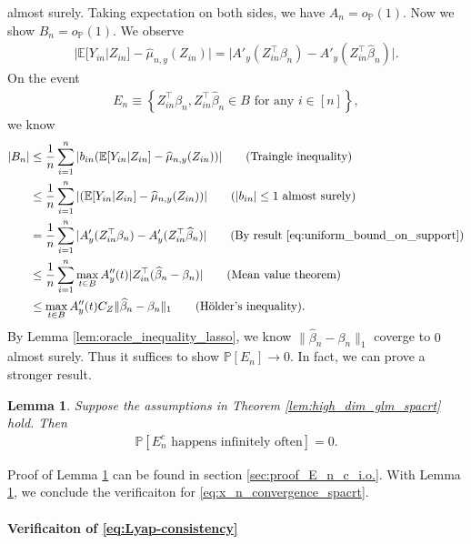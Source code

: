 \documentclass[12pt]{article}
\newtheorem{lemma}{Lemma}
\theoremstyle{definition}
\def\P{\mathbb{P}}
\def\P{\mathbb{P}}
\newcommand{\E}{\mathbb E}								%
\renewcommand{\P}{\mathbb{P}}							%
\newcommand{\srz}{Z}									%
\newcommand{\sry}{Y}									%
\begin{document}
almost surely. Taking expectation on both sides, we have $A_n=o_\P(1)$. Now we show $B_n=o_{\P}(1)$. We observe
\begin{align}\label{eq:uniform_bound_on_support}
  |\E[Y_{in}|\srz_{in}]-\widehat{\mu}_{n,y}(\srz_{in})|=|A'_y(\srz_{in}^\top\beta_n)-A'_y(\srz_{in}^\top \widehat \beta_n)|.
\end{align}
On the event 
\begin{align}\label{eq:magnitude_predictor}
  E_n\equiv \left\{\srz_{in}^\top\beta_n,\srz_{in}^\top \widehat \beta_n\in B\text{ for any }i\in[n]\right\},
\end{align}
we know
\begin{align*}
  |B_n|
  &
  \leq\frac{1}{n}\sum_{i=1}^n |b_{in}(\E[\sry_{in}|\srz_{in}]-\widehat{\mu}_{n,y}(\srz_{in}))|\tag{Traingle inequality}\\
  &
  \leq\frac{1}{n}\sum_{i=1}^n |(\E[\sry_{in}|\srz_{in}]-\widehat{\mu}_{n,y}(\srz_{in}))|\tag{$|b_{in}|\leq 1$ almost surely}\\
  &
  = \frac{1}{n}\sum_{i=1}^n|A'_y(\srz_{in}^\top\beta_n)-A'_y(\srz_{in}^\top \widehat \beta_n)|\tag{By result \eqref{eq:uniform_bound_on_support}}\\
  &
  \leq \frac{1}{n}\sum_{i=1}^n\max_{t\in B}A''_y(t)|\srz_{in}^\top(\widehat{\beta}_n-\beta_n)|\tag{Mean value theorem}\\
  &
  \leq \max_{t\in B}A''_y(t)C_Z\|\widehat{\beta}_n-\beta_n\|_1\tag{H\"older's inequality}.
\end{align*}
By Lemma \ref{lem:oracle_inequality_lasso}, we know $\|\widehat{\beta}_n-\beta_n\|_1$ coverge to $0$ almost surely. Thus it suffices to show $\P[E_n]\rightarrow0$. In fact, we can prove a stronger result.
\begin{lemma}\label{lem:E_n_c_i.o.}
  Suppose the assumptions in Theorem \ref{lem:high_dim_glm_spacrt} hold. Then
  \begin{align*}
    \P[E_n^c \text{ happens infinitely often}]=0.
  \end{align*}
\end{lemma}
\noindent Proof of Lemma \ref{lem:E_n_c_i.o.} can be found in section \ref{sec:proof_E_n_c_i.o.}. With Lemma \ref{lem:E_n_c_i.o.}, we conclude the verificaiton for \eqref{eq:x_n_convergence_spacrt}. 

\paragraph{Verificaiton of \eqref{eq:Lyap-consistency}}
\end{document}
